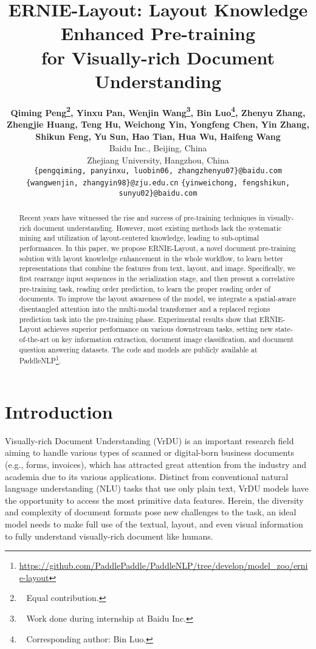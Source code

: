 \documentclass[11pt]{article}
\title{ERNIE-Layout: Layout Knowledge Enhanced Pre-training  \\ for Visually-rich Document Understanding}
\author{
\textbf{Qiming Peng\thanks{~ Equal contribution.}, Yinxu Pan\footnotemark[1], Wenjin Wang\footnotemark[1]\thanks{~ Work done during internship at Baidu Inc.}, Bin Luo\thanks{~ Corresponding author: Bin Luo.}, Zhenyu Zhang,} \\ 
\textbf{Zhengjie Huang, Teng Hu, Weichong Yin, Yongfeng Chen, Yin Zhang,} \\ 
\textbf{Shikun Feng, Yu Sun, Hao Tian, Hua Wu, Haifeng Wang} \\
Baidu Inc., Beijing, China \\
Zhejiang University, Hangzhou, China \\
{\small \texttt{\{pengqiming, panyinxu, luobin06, zhangzhenyu07\}@baidu.com}} \\
{\small \texttt{\{wangwenjin, zhangyin98\}@zju.edu.cn} \quad \texttt{\{yinweichong, fengshikun, sunyu02\}@baidu.com}}
}
\begin{document}
\maketitle
\begin{abstract}

Recent years have witnessed the rise and success of pre-training techniques in visually-rich document understanding.
However, most existing methods lack the systematic mining and utilization of layout-centered knowledge, leading to sub-optimal performances.
In this paper, we propose ERNIE-Layout, a novel document pre-training solution with layout knowledge enhancement in the whole workflow, to learn better representations that combine the features from text, layout, and image.
Specifically, we first rearrange input sequences in the serialization stage, and then present a correlative pre-training task, reading order prediction, to learn the proper reading order of documents.
To improve the layout awareness of the model, we integrate a spatial-aware disentangled attention into the multi-modal transformer and a replaced regions prediction task into the pre-training phase. 
Experimental results show that ERNIE-Layout achieves superior performance on various downstream tasks, setting new state-of-the-art on key information extraction, document image classification, and document question answering datasets. 
The code and models are publicly available at PaddleNLP\footnote{\url{https://github.com/PaddlePaddle/PaddleNLP/tree/develop/model_zoo/ernie-layout}}.

\end{abstract}


\section{Introduction}
Visually-rich Document Understanding (VrDU) is an important research field aiming to handle various types of scanned or digital-born business documents (e.g., forms, invoices), which has attracted great attention from the industry and academia due to its various applications.
Distinct from conventional natural language understanding (NLU) tasks that use only plain text, VrDU models have the opportunity to access the most primitive data features.
Herein, the diversity and complexity of document formats pose new challenges to the task, an ideal model needs to make full use of the textual, layout, and even visual information to fully understand visually-rich document like humans.
\end{document}
